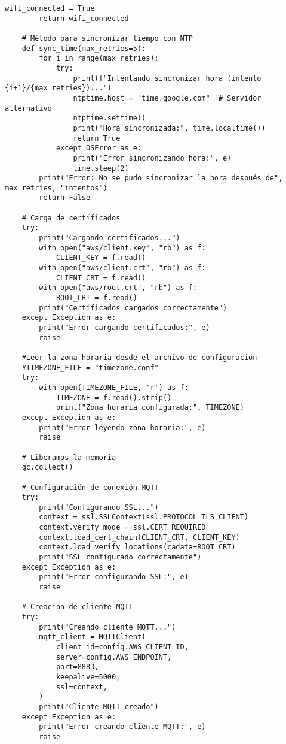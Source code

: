 \begin{lstlisting}[label=cod:firmware,caption=Firmware nodo sensor de consumos. , language=PythonUTF8]
            wifi_connected = True
        return wifi_connected
    
    # Método para sincronizar tiempo con NTP
    def sync_time(max_retries=5):
        for i in range(max_retries):
            try:
                print(f"Intentando sincronizar hora (intento {i+1}/{max_retries})...")
                ntptime.host = "time.google.com"  # Servidor alternativo
                ntptime.settime()
                print("Hora sincronizada:", time.localtime())
                return True
            except OSError as e:
                print("Error sincronizando hora:", e)
                time.sleep(2)
        print("Error: No se pudo sincronizar la hora después de", max_retries, "intentos")
        return False
    
    # Carga de certificados
    try:
        print("Cargando certificados...")
        with open("aws/client.key", "rb") as f:
            CLIENT_KEY = f.read()
        with open("aws/client.crt", "rb") as f:
            CLIENT_CRT = f.read()
        with open("aws/root.crt", "rb") as f:
            ROOT_CRT = f.read()
        print("Certificados cargados correctamente")
    except Exception as e:
        print("Error cargando certificados:", e)
        raise
    
    #Leer la zona horaria desde el archivo de configuración
    #TIMEZONE_FILE = "timezone.conf"
    try:
        with open(TIMEZONE_FILE, 'r') as f:
            TIMEZONE = f.read().strip()
            print("Zona horaria configurada:", TIMEZONE)
    except Exception as e:
        print("Error leyendo zona horaria:", e)
        raise
    
    # Liberamos la memoria
    gc.collect()
    
    # Configuración de conexión MQTT
    try:
        print("Configurando SSL...")
        context = ssl.SSLContext(ssl.PROTOCOL_TLS_CLIENT)
        context.verify_mode = ssl.CERT_REQUIRED
        context.load_cert_chain(CLIENT_CRT, CLIENT_KEY)
        context.load_verify_locations(cadata=ROOT_CRT)
        print("SSL configurado correctamente")
    except Exception as e:
        print("Error configurando SSL:", e)
        raise
    
    # Creación de cliente MQTT
    try:
        print("Creando cliente MQTT...")
        mqtt_client = MQTTClient(
            client_id=config.AWS_CLIENT_ID,
            server=config.AWS_ENDPOINT,
            port=8883,
            keepalive=5000,
            ssl=context,
        )
        print("Cliente MQTT creado")
    except Exception as e:
        print("Error creando cliente MQTT:", e)
        raise
    

\end{lstlisting}
